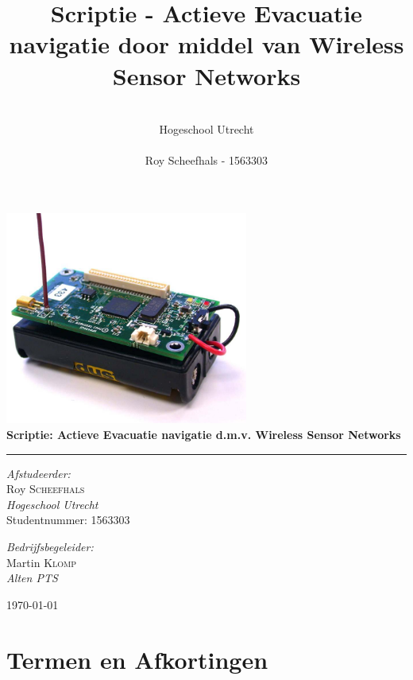 \documentclass{../local}
\title{\textbf{Scriptie - Actieve Evacuatie navigatie door middel van Wireless Sensor Networks}}
\author{\\
		Hogeschool Utrecht\\
		\\
		Roy Scheefhals - 1563303}
\begin{document}
\begin{titlepage}
\begin{center}

\includegraphics[width=0.6\textwidth]{mica2}~\\[1cm]

{ \huge \bfseries Scriptie: Actieve Evacuatie navigatie d.m.v. Wireless Sensor Networks\\[0.4cm] }
\hrule
\hspace{0pt} 
\vspace{\fill}

\begin{minipage}{0.4\textwidth}
\begin{flushleft} \large
\emph{Afstudeerder:}\\
Roy \textsc{Scheefhals}\\
\emph{Hogeschool Utrecht}\\
Studentnummer: 1563303\\
\end{flushleft}
\end{minipage}
\begin{minipage}{0.4\textwidth}
\begin{flushright} \large
\emph{Bedrijfsbegeleider:} \\
Martin \textsc{Klomp}\\
\emph{Alten PTS}
\end{flushright}
\end{minipage}

\end{center}
\today
\end{titlepage}

\renewcommand{\thesection}{\Roman{section}}
\newpage{}

\section{Termen en Afkortingen}

\end{document}
